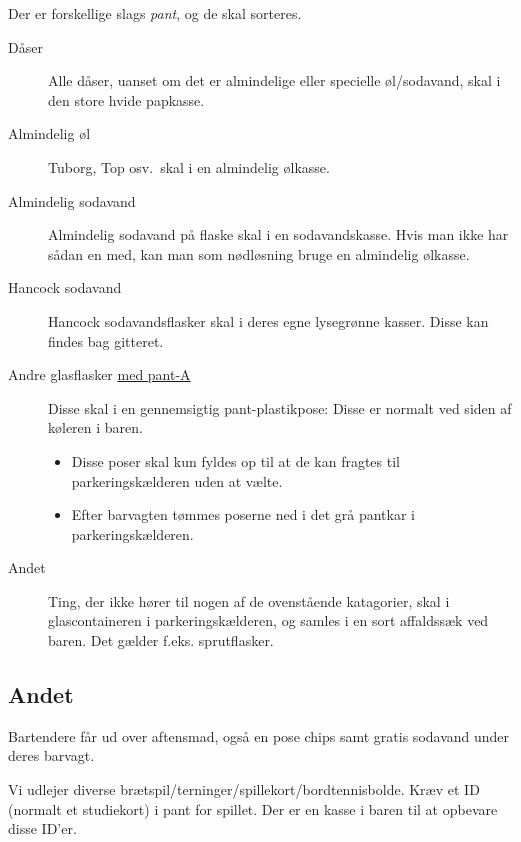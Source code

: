 Der er forskellige slags \textit{pant}, og de skal sorteres.
\begin{description}
\item[Dåser] Alle dåser, uanset om det er almindelige eller specielle
  øl/sodavand, skal i den store hvide papkasse.
\item[Almindelig øl] Tuborg, Top osv.\ skal i en almindelig ølkasse.
\item[Almindelig sodavand] Almindelig sodavand på flaske skal i en
  sodavandskasse. Hvis man ikke har sådan en med, kan man som
  nødløsning bruge en almindelig ølkasse.%
  \item[Hancock sodavand] Hancock sodavandsflasker skal i deres egne lysegrønne kasser. Disse kan findes bag gitteret.
\item[Andre glasflasker \underline{med pant-A}] Disse skal i en gennemsigtig
  pant-plastikpose: Disse er normalt ved siden af køleren i baren.
  \begin{itemize}
    \item Disse poser skal kun fyldes op til at de kan fragtes til parkeringskælderen uden at vælte.
    \item Efter barvagten tømmes poserne ned i det grå pantkar i parkeringskælderen.
  \end{itemize}
\item[Andet] Ting, der ikke hører til nogen af de ovenstående
  katagorier, skal i glascontaineren i parkeringskælderen, 
  og samles i en sort affaldssæk ved baren. Det gælder f.eks. sprutflasker.
\end{description}

\subsection{Andet}
\label{sec:intra:andet}

Bartendere får ud over aftensmad, også en pose chips samt gratis
sodavand under deres barvagt.

Vi udlejer diverse
brætspil/terninger/spillekort/bordtennisbolde. Kræv et ID (normalt et
studiekort) i pant for spillet. Der er en kasse i baren til at
opbevare disse ID'er.

